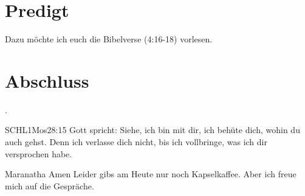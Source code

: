 \documentclass{../../inc/mybib}
\begin{document}
\section{Predigt}

Dazu möchte ich euch die Bibelverse (4:16-18) vorlesen.






\section{Abschluss}

 .

\beten{}

\begin{bibelbox}{SCHL}{1Mos}{28:15}
    Gott spricht: Siehe, ich bin mit dir,
    ich behüte dich, wohin du auch gehst.
    Denn ich verlasse dich nicht,
    bis ich vollbringe, was ich dir versprochen habe.
\end{bibelbox}

Maranatha Amen
Leider gibs am Heute nur noch Kapselkaffee. Aber ich freue mich auf die Gespräche.
\end{document}
